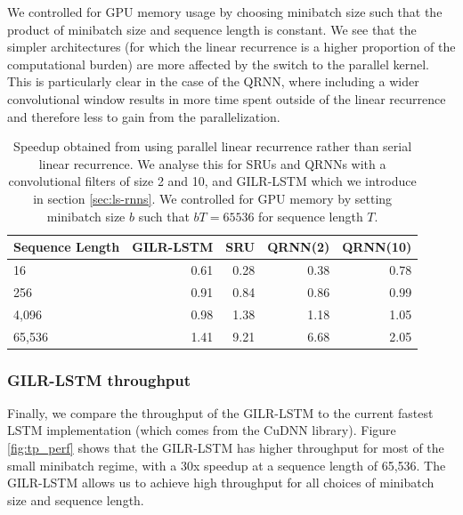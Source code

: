 \documentclass{article}
\begin{document}
We controlled for GPU memory usage by choosing minibatch size such that the product
of minibatch size and sequence length is constant. We see that the simpler architectures
(for which the linear recurrence is a higher proportion of the
computational burden) are more affected by the switch to the parallel kernel.  This is
particularly clear in the case of the QRNN, where including a wider
convolutional window results in more time spent outside of the linear recurrence and
therefore less to gain from the parallelization.
\begin{table}
\begin{center}
  \begin{tabular}{@{}lrrrr@{}}
    \label{table:rnn-throughput}
Sequence Length & GILR-LSTM & SRU & QRNN(2) & QRNN(10)\\ \midrule
16 & 0.61 & 0.28 & 0.38 & 0.78\\
256 & 0.91 & 0.84 & 0.86 & 0.99\\
4,096 & 0.98 & 1.38 & 1.18 & 1.05\\
65,536 & 1.41 & 9.21 & 6.68 & 2.05\\ \bottomrule
  \end{tabular}
\end{center}
\caption{
  Speedup obtained from using parallel linear recurrence rather than
  serial linear recurrence. We analyse this for
  SRUs \cite{lei2017} and QRNNs \cite{bradbury2017quasi} with a convolutional
  filters of size 2 and 10, and GILR-LSTM which we introduce in section \ref{sec:ls-rnns}.
  We controlled for GPU memory by setting minibatch size $b$ such that
  $bT = 65536$ for sequence length $T$.
}
\end{table}


\subsubsection{GILR-LSTM throughput}

Finally, we compare the throughput of the GILR-LSTM to the current fastest
LSTM implementation (which comes from the CuDNN library). Figure
\ref{fig:tp_perf} shows that the GILR-LSTM has higher throughput for most of the
small minibatch regime, with a 30x speedup at a sequence length of 65,536.
The GILR-LSTM allows us to achieve high throughput for all choices of minibatch size and
sequence length.
\end{document}
